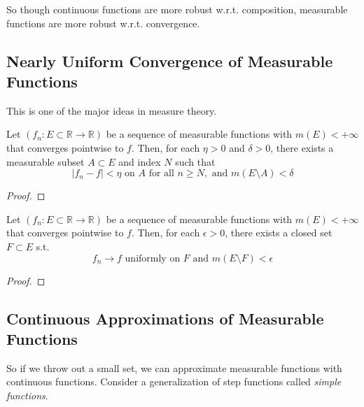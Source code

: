   So though continuous functions are more robust w.r.t. composition, measurable functions are more robust w.r.t. convergence. 

\subsection{Nearly Uniform Convergence of Measurable Functions} 

  This is one of the major ideas in measure theory. 

  \begin{lemma} 
    Let $(f_n: E \subset \mathbb{R} \to \mathbb{R})$ be a sequence of measurable functions with $m(E) < +\infty$ that converges pointwise to $f$. Then, for each $\eta > 0$ and $\delta > 0$, there exists a measurable subset $A \subset E$ and index $N$ such that 
    \begin{equation}
      |f_n - f| < \eta \text{ on } A \text{ for all } n \geq N, \text{ and } m(E \setminus A) < \delta 
    \end{equation}
  \end{lemma}
  \begin{proof}
    
  \end{proof}

  \begin{theorem}[Egoroff]
    Let $(f_n: E \subset \mathbb{R} \to \mathbb{R})$ be a sequence of measurable functions with $m(E) < +\infty$ that converges pointwise to $f$. Then, for each $\epsilon > 0$, there exists a closed set $F \subset E$  s.t. 
    \begin{equation}
      f_n \to f \text{ uniformly on } F \text{ and } m(E \setminus F) < \epsilon
    \end{equation}
  \end{theorem}
  \begin{proof}
    
  \end{proof}

\subsection{Continuous Approximations of Measurable Functions}

  So if we throw out a small set, we can approximate measurable functions with continuous functions. Consider a generalization of step functions called \textit{simple functions}. 


